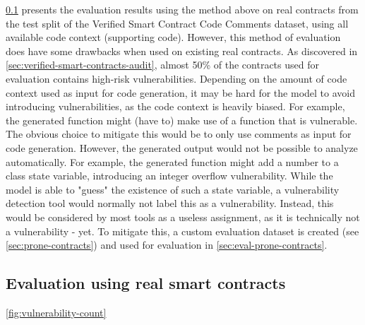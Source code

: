 \cref{sec:eval-rq2-comment-pluss-code-context} presents the evaluation results using the method above on real contracts from the test split of the Verified Smart Contract Code Comments dataset, using all available code context (supporting code). However, this method of evaluation does have some drawbacks when used on existing real contracts. As discovered in \cref{sec:verified-smart-contracts-audit}, almost 50\% of the contracts used for evaluation contains high-risk vulnerabilities. Depending on the amount of code context used as input for code generation, it may be hard for the model to avoid introducing vulnerabilities, as the code context is heavily biased. For example, the generated function might (have to) make use of a function that is vulnerable. The obvious choice to mitigate this would be to only use comments as input for code generation. However, the generated output would not be possible to analyze automatically. For example, the generated function might add a number to a class state variable, introducing an integer overflow vulnerability. While the model is able to "guess" the existence of such a state variable, a vulnerability detection tool would normally not label this as a vulnerability. Instead, this would be considered by most tools as a useless assignment, as it is technically not a vulnerability - yet. To mitigate this, a custom evaluation dataset is created (see \cref{sec:prone-contracts}) and used for evaluation in \cref{sec:eval-prone-contracts}.


\subsection{Evaluation using real smart contracts}
\label{sec:eval-rq2-comment-pluss-code-context}
\cref{fig:vulnerability-count}

